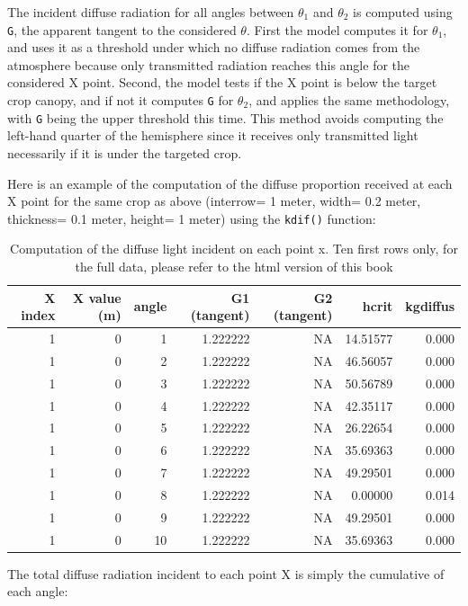 \documentclass[]{book}
\theoremstyle{definition}
\theoremstyle{definition}
\theoremstyle{definition}
\theoremstyle{remark}
\begin{document}
The incident diffuse radiation for all angles between \(\theta_1\) and
\(\theta_2\) is computed using \texttt{G}, the apparent tangent to the
considered \(\theta\). First the model computes it for \(\theta_1\), and
uses it as a threshold under which no diffuse radiation comes from the
atmosphere because only transmitted radiation reaches this angle for the
considered X point. Second, the model tests if the X point is below the
target crop canopy, and if not it computes \texttt{G} for \(\theta_2\),
and applies the same methodology, with \texttt{G} being the upper
threshold this time. This method avoids computing the left-hand quarter
of the hemisphere since it receives only transmitted light necessarily
if it is under the targeted crop.

Here is an example of the computation of the diffuse proportion received
at each X point for the same crop as above (interrow= 1 meter, width=
0.2 meter, thickness= 0.1 meter, height= 1 meter) using the
\texttt{kdif()} function:

\begin{longtable}[t]{r|r|r|r|r|r|r}
\caption{\label{tab:kdiff}Computation of the diffuse light incident on each point x. Ten first rows only, for the full data, please refer to the html version of this book}\\
\hline
X index & X value (m) & angle & G1 (tangent) & G2 (tangent) & hcrit & kgdiffus\\
\hline
1 & 0 & 1 & 1.222222 & NA & 14.51577 & 0.000\\
\hline
1 & 0 & 2 & 1.222222 & NA & 46.56057 & 0.000\\
\hline
1 & 0 & 3 & 1.222222 & NA & 50.56789 & 0.000\\
\hline
1 & 0 & 4 & 1.222222 & NA & 42.35117 & 0.000\\
\hline
1 & 0 & 5 & 1.222222 & NA & 26.22654 & 0.000\\
\hline
1 & 0 & 6 & 1.222222 & NA & 35.69363 & 0.000\\
\hline
1 & 0 & 7 & 1.222222 & NA & 49.29501 & 0.000\\
\hline
1 & 0 & 8 & 1.222222 & NA & 0.00000 & 0.014\\
\hline
1 & 0 & 9 & 1.222222 & NA & 49.29501 & 0.000\\
\hline
1 & 0 & 10 & 1.222222 & NA & 35.69363 & 0.000\\
\hline
\end{longtable}

The total diffuse radiation incident to each point X is simply the
cumulative of each angle:
\end{document}

